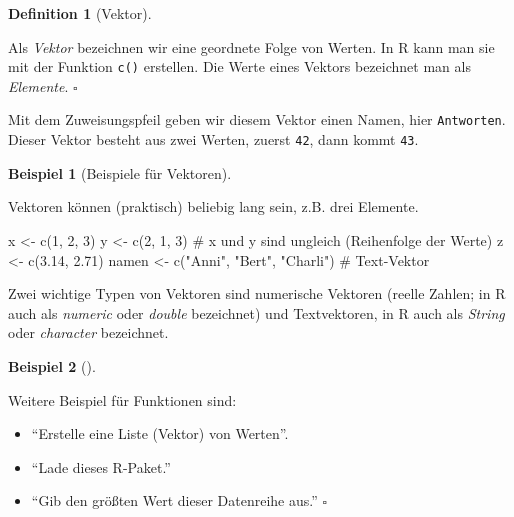 \documentclass[
  a4paper,
  DIV=11]{scrreprt}
\newenvironment{Shaded}{\begin{snugshade}}{\end{snugshade}}
\newcommand{\CommentTok}[1]{\textcolor[rgb]{0.37,0.37,0.37}{#1}}
\newcommand{\DecValTok}[1]{\textcolor[rgb]{0.68,0.00,0.00}{#1}}
\newcommand{\FloatTok}[1]{\textcolor[rgb]{0.68,0.00,0.00}{#1}}
\newcommand{\FunctionTok}[1]{\textcolor[rgb]{0.28,0.35,0.67}{#1}}
\newcommand{\NormalTok}[1]{\textcolor[rgb]{0.00,0.23,0.31}{#1}}
\newcommand{\OtherTok}[1]{\textcolor[rgb]{0.00,0.23,0.31}{#1}}
\newcommand{\StringTok}[1]{\textcolor[rgb]{0.13,0.47,0.30}{#1}}
\providecommand{\tightlist}{%
  \setlength{\itemsep}{0pt}\setlength{\parskip}{0pt}}\usepackage{longtable,booktabs,array}
\theoremstyle{definition}
\theoremstyle{definition}
\newtheorem{example}{Beispiel}[chapter]
\theoremstyle{definition}
\newtheorem{definition}{Definition}[chapter]
\theoremstyle{remark}
\begin{document}
\begin{definition}[Vektor]\protect\hypertarget{def-vektor}{}\label{def-vektor}

Als \emph{Vektor} bezeichnen wir eine geordnete Folge von Werten. In R
kann man sie mit der Funktion \texttt{c()} erstellen. Die Werte eines
Vektors bezeichnet man als \emph{Elemente}. \(\square\)

\end{definition}

Mit dem Zuweisungspfeil geben wir diesem Vektor einen Namen, hier
\texttt{Antworten}. Dieser Vektor besteht aus zwei Werten, zuerst
\texttt{42}, dann kommt \texttt{43}.

\begin{example}[Beispiele für
Vektoren]\protect\hypertarget{exm-vektoren}{}\label{exm-vektoren}

Vektoren können (praktisch) beliebig lang sein, z.B. drei Elemente.

\begin{Shaded}
\begin{Highlighting}[]
\NormalTok{x }\OtherTok{\textless{}{-}} \FunctionTok{c}\NormalTok{(}\DecValTok{1}\NormalTok{, }\DecValTok{2}\NormalTok{, }\DecValTok{3}\NormalTok{)}
\NormalTok{y }\OtherTok{\textless{}{-}} \FunctionTok{c}\NormalTok{(}\DecValTok{2}\NormalTok{, }\DecValTok{1}\NormalTok{, }\DecValTok{3}\NormalTok{)  }\CommentTok{\# x und y sind ungleich (Reihenfolge der Werte)}
\NormalTok{z }\OtherTok{\textless{}{-}} \FunctionTok{c}\NormalTok{(}\FloatTok{3.14}\NormalTok{, }\FloatTok{2.71}\NormalTok{)  }
\NormalTok{namen }\OtherTok{\textless{}{-}} \FunctionTok{c}\NormalTok{(}\StringTok{"Anni"}\NormalTok{, }\StringTok{"Bert"}\NormalTok{, }\StringTok{"Charli"}\NormalTok{) }\CommentTok{\# Text{-}Vektor}
\end{Highlighting}
\end{Shaded}

\end{example}

Zwei wichtige Typen von Vektoren sind numerische Vektoren (reelle
Zahlen; in R auch als \emph{numeric} oder \emph{double} bezeichnet) und
Textvektoren, in R auch als \emph{String} oder \emph{character}
bezeichnet.

\begin{example}[]\protect\hypertarget{exm-funs}{}\label{exm-funs}

Weitere Beispiel für Funktionen sind:

\begin{itemize}
\tightlist
\item
  ``Erstelle eine Liste (Vektor) von Werten''.
\item
  ``Lade dieses R-Paket.''
\item
  ``Gib den größten Wert dieser Datenreihe aus.'' \(\square\)
\end{itemize}

\end{example}
\end{document}
